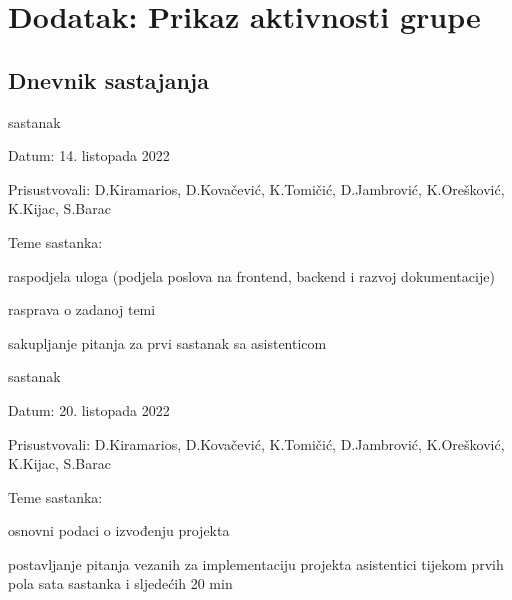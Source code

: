 \chapter*{Dodatak: Prikaz aktivnosti grupe}
		
		\section*{Dnevnik sastajanja}
		
		
		\begin{packed_enum}
			\item  sastanak
			
			\item[] \begin{packed_item}
				\item Datum: 14. listopada 2022
				\item Prisustvovali: D.Kiramarios, D.Kovačević, K.Tomičić, D.Jambrović, K.Orešković, K.Kijac, S.Barac
				\item Teme sastanka:
				\begin{packed_item}
					\item  raspodjela uloga (podjela poslova na frontend, backend i razvoj dokumentacije)
					\item  rasprava o zadanoj temi
					\item  sakupljanje pitanja za prvi sastanak sa asistenticom
				\end{packed_item}
			\end{packed_item}
			
			\item  sastanak
			\item[] \begin{packed_item}
				\item Datum: 20. listopada 2022
				\item Prisustvovali: D.Kiramarios, D.Kovačević, K.Tomičić, D.Jambrović, K.Orešković, K.Kijac, S.Barac
				\item Teme sastanka:
				\begin{packed_item}
					\item  osnovni podaci o izvođenju projekta
					\item  postavljanje pitanja vezanih za implementaciju projekta asistentici tijekom prvih pola sata sastanka i sljedećih 20 min
				\end{packed_item}
			\end{packed_item}


\end{packed_enum}
